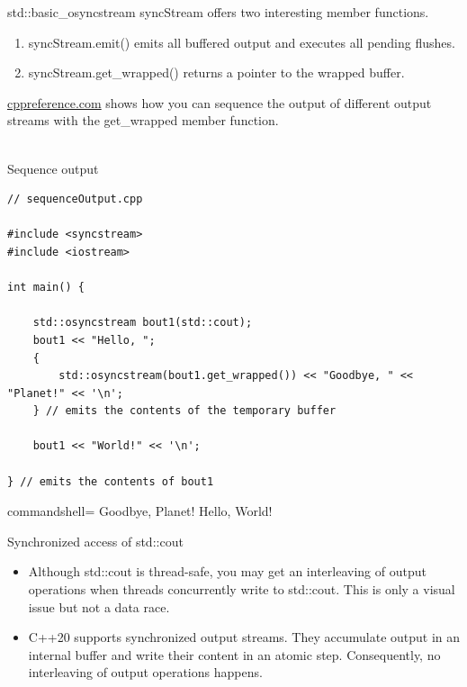 std::basic\_osyncstream syncStream offers two interesting member functions.

\begin{enumerate}
\item 
syncStream.emit() emits all buffered output and executes all pending flushes.

\item 
syncStream.get\_wrapped() returns a pointer to the wrapped buffer.
\end{enumerate}

\href{https://en.cppreference.com/w/cpp/io/basic_osyncstream/get_wrapped}{cppreference.com} shows how you can sequence the output of different output streams with the get\_wrapped member function.

\hspace*{\fill} \\ %
\noindent
Sequence output
\begin{lstlisting}[style=styleCXX]
// sequenceOutput.cpp

#include <syncstream>
#include <iostream>

int main() {
	
	std::osyncstream bout1(std::cout);
	bout1 << "Hello, ";
	{
		std::osyncstream(bout1.get_wrapped()) << "Goodbye, " << "Planet!" << '\n';
	} // emits the contents of the temporary buffer

	bout1 << "World!" << '\n';
	
} // emits the contents of bout1
\end{lstlisting}

\begin{tcblisting}{commandshell={}}
Goodbye, Planet!
Hello, World!
\end{tcblisting}

\begin{center}
Synchronized access of std::cout
\end{center}

\begin{tcolorbox}[colback=mygreen!5!white,colframe=mygreen!75!black,title={Distilled Information}]
	
\begin{itemize}
\item 
Although std::cout is thread-safe, you may get an interleaving of output operations when threads concurrently write to std::cout. This is only a visual issue but not a data race.

\item 
C++20 supports synchronized output streams. They accumulate output in an internal buffer and write their content in an atomic step. Consequently, no interleaving of output operations happens.
\end{itemize}
	
\end{tcolorbox}



